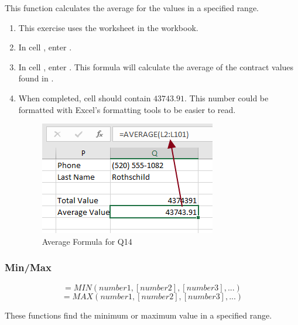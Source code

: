 This function calculates the average for the values in a specified range. 

\begin{enumerate}
	\item This exercise uses the  worksheet in the  workbook.
	\item In cell , enter .
	\item In cell , enter . This formula will calculate the average of the contract values found in .
	\item When completed, cell  should contain $ 43743.91 $. This number could be formatted with Excel's formatting tools to be easier to read.

	\begin{figure}[H]
		\centering
		\includegraphics[width=\maxwidth{.75\linewidth}]{gfx/ch09_fig39}
		\caption{Average Formula for Q14}
		\label{09:fig39}
	\end{figure}

\end{enumerate}

\subsubsection{Min/Max}

\[ =MIN(number1, [number2], [number3], ...) \]
\[ =MAX(number1, [number2], [number3], ...) \]

These functions find the minimum or maximum value in a specified range. 

